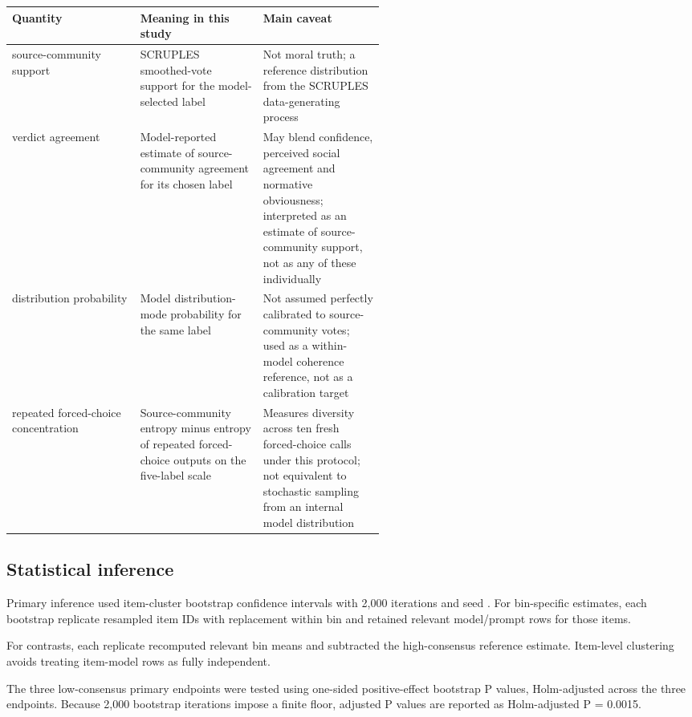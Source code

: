 \documentclass[11pt]{article}
\begin{document}
\begin{landscape}
\scriptsize
\setlength{\tabcolsep}{2pt}
\renewcommand{\arraystretch}{1.18}
\begin{longtable}{>{\raggedright\arraybackslash}p{0.18\linewidth}>{\raggedright\arraybackslash}p{0.18\linewidth}>{\raggedright\arraybackslash}p{0.18\linewidth}}
 \toprule
Quantity & Meaning in this study & Main caveat \\
 \midrule
source-community support & SCRUPLES smoothed-vote support for the model-selected label & Not moral truth; a reference distribution from the SCRUPLES data-generating process \\
verdict agreement & Model-reported estimate of source-community agreement for its chosen label & May blend confidence, perceived social agreement and normative obviousness; interpreted as an estimate of source-community support, not as any of these individually \\
distribution probability & Model distribution-mode probability for the same label & Not assumed perfectly calibrated to source-community votes; used as a within-model coherence reference, not as a calibration target \\
repeated forced-choice concentration & Source-community entropy minus entropy of repeated forced-choice outputs on the five-label scale & Measures diversity across ten fresh forced-choice calls under this protocol; not equivalent to stochastic sampling from an internal model distribution \\
 \bottomrule
\end{longtable}
\normalsize
\setlength{\tabcolsep}{6pt}
\renewcommand{\arraystretch}{1}
\end{landscape}

\subsection{Statistical inference}

Primary inference used item-cluster bootstrap confidence intervals with 2,000 iterations and seed . For bin-specific estimates, each bootstrap replicate resampled item IDs with replacement within bin and retained relevant model/prompt rows for those items.

For contrasts, each replicate recomputed relevant bin means and subtracted the high-consensus reference estimate. Item-level clustering avoids treating item-model rows as fully independent.

The three low-consensus primary endpoints were tested using one-sided positive-effect bootstrap P values, Holm-adjusted across the three endpoints. Because 2,000 bootstrap iterations impose a finite floor, adjusted P values are reported as Holm-adjusted P = 0.0015.
\end{document}
